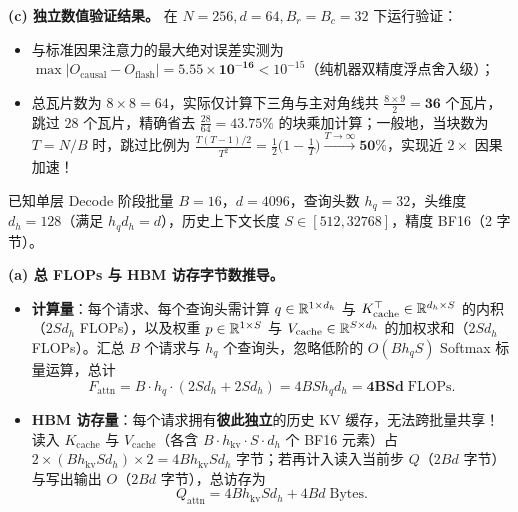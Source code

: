 \textbf{(c) 独立数值验证结果。} 在 $N = 256, d = 64, B_r = B_c = 32$ 下运行验证：
\begin{itemize}
  \item 与标准因果注意力的最大绝对误差实测为 $\max|O_{\mathrm{causal}} - O_{\mathrm{flash}}| = \mathbf{5.55 \times 10^{-16}} < 10^{-15}$（纯机器双精度浮点舍入级）；
  \item 总瓦片数为 $8 \times 8 = 64$，实际仅计算下三角与主对角线共 $\frac{8 \times 9}{2} = \mathbf{36}$ 个瓦片，跳过 $28$ 个瓦片，精确省去 $\frac{28}{64} = \mathbf{43.75\%}$ 的块乘加计算；一般地，当块数为 $T = N / B$ 时，跳过比例为 $\frac{T(T-1)/2}{T^2} = \frac{1}{2}\big(1 - \frac{1}{T}\big) \xrightarrow{T \to \infty} \mathbf{50\%}$，实现近 $2\times$ 因果加速！
\end{itemize}


已知单层 Decode 阶段批量 $B = 16$，$d = 4096$，查询头数 $h_q = 32$，头维度 $d_h = 128$（满足 $h_q d_h = d$），历史上下文长度 $S \in [512, 32768]$，精度 BF16（2 字节）。

\textbf{(a) 总 FLOPs 与 HBM 访存字节数推导。}
\begin{itemize}
  \item \textbf{计算量}：每个请求、每个查询头需计算 $q \in \mathbb{R}^{1 \times d_h}$ 与 $K_{\mathrm{cache}}^\top \in \mathbb{R}^{d_h \times S}$ 的内积（$2 S d_h$ FLOPs），以及权重 $p \in \mathbb{R}^{1 \times S}$ 与 $V_{\mathrm{cache}} \in \mathbb{R}^{S \times d_h}$ 的加权求和（$2 S d_h$ FLOPs）。汇总 $B$ 个请求与 $h_q$ 个查询头，忽略低阶的 $O(B h_q S)$ Softmax 标量运算，总计
  \[
    F_{\mathrm{attn}} = B \cdot h_q \cdot (2 S d_h + 2 S d_h) = 4 B S h_q d_h = \mathbf{4 B S d}\;\text{FLOPs}.
  \]
  \item \textbf{HBM 访存量}：每个请求拥有\textbf{彼此独立}的历史 KV 缓存，无法跨批量共享！读入 $K_{\mathrm{cache}}$ 与 $V_{\mathrm{cache}}$（各含 $B \cdot h_{\mathrm{kv}} \cdot S \cdot d_h$ 个 BF16 元素）占 $2 \times (B h_{\mathrm{kv}} S d_h) \times 2 = 4 B h_{\mathrm{kv}} S d_h$ 字节；若再计入读入当前步 $Q$（$2Bd$ 字节）与写出输出 $O$（$2Bd$ 字节），总访存为
  \[
    Q_{\mathrm{attn}} = 4 B h_{\mathrm{kv}} S d_h + 4 B d\;\text{Bytes}.
  \]
\end{itemize}

